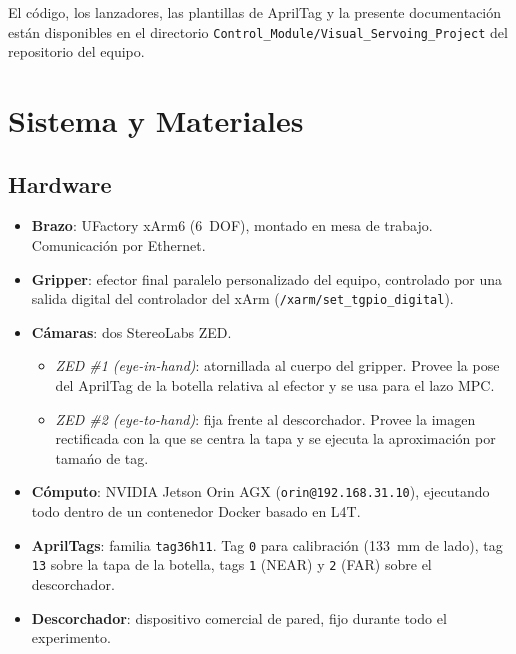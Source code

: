 \documentclass[conference]{IEEEtran}
\begin{document}
El c\'odigo, los lanzadores, las plantillas de AprilTag y la presente
documentaci\'on est\'an disponibles en el directorio
\texttt{Control\_Module/Visual\_Servoing\_Project} del repositorio del
equipo.

\section{Sistema y Materiales}

\subsection{Hardware}

\begin{itemize}
  \item \textbf{Brazo}: UFactory xArm6 (6~DOF), montado en mesa de
        trabajo. Comunicaci\'on por Ethernet.
  \item \textbf{Gripper}: efector final paralelo personalizado del
        equipo, controlado por una salida digital del controlador del
        xArm (\texttt{/xarm/set\_tgpio\_digital}).
  \item \textbf{C\'amaras}: dos StereoLabs ZED.
        \begin{itemize}
          \item \emph{ZED \#1 (eye-in-hand)}: atornillada al cuerpo
                del gripper. Provee la pose del AprilTag de la botella
                relativa al efector y se usa para el lazo MPC.
          \item \emph{ZED \#2 (eye-to-hand)}: fija frente al
                descorchador. Provee la imagen rectificada con la que
                se centra la tapa y se ejecuta la aproximaci\'on por
                tama\'no de tag.
        \end{itemize}
  \item \textbf{C\'omputo}: NVIDIA Jetson Orin AGX
        (\texttt{orin@192.168.31.10}), ejecutando todo dentro de un
        contenedor Docker basado en L4T.
  \item \textbf{AprilTags}: familia \texttt{tag36h11}. Tag \texttt{0}
        para calibraci\'on (\SI{133}{\milli\meter} de lado), tag
        \texttt{13} sobre la tapa de la botella, tags \texttt{1}
        (NEAR) y \texttt{2} (FAR) sobre el descorchador.
  \item \textbf{Descorchador}: dispositivo comercial de pared, fijo
        durante todo el experimento.
\end{itemize}
\end{document}
